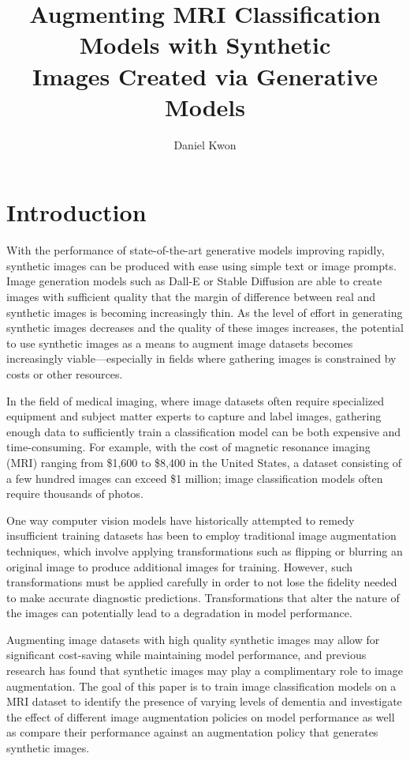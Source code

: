 \documentclass [MAS] {uclathes}
\title          {Augmenting MRI Classification Models with Synthetic \\
                Images Created via Generative Models}
\author         {Daniel Kwon}
\begin{document}
\makeintropages


\chapter{Introduction}
With the performance of state-of-the-art generative models improving rapidly, synthetic images can be produced with ease 
using simple text or image prompts. Image generation models such as Dall-E or Stable Diffusion are able to create images 
with sufficient quality that the margin of difference between real and synthetic images is becoming increasingly thin. 
As the level of effort in generating synthetic images decreases and the quality of these images increases, the potential 
to use synthetic images as a means to augment image datasets becomes increasingly viable---especially in fields where 
gathering images is constrained by costs or other resources.

In the field of medical imaging, where image datasets often require specialized equipment and subject matter experts to 
capture and label images, gathering enough data to sufficiently train a classification model can be both expensive and 
time-consuming. For example, with the cost of magnetic resonance imaging (MRI) ranging from \$1,600 to \$8,400 in the 
United States, a dataset consisting of a few hundred images can exceed \$1 million; image classification models often 
require thousands of photos. 

One way computer vision models have historically attempted to remedy insufficient training datasets has been to employ 
traditional image augmentation techniques, which involve applying transformations such as flipping or blurring an 
original image to produce additional images for training. However, such transformations must be applied carefully in 
order to not lose the fidelity needed to make accurate diagnostic predictions. Transformations that alter the nature of 
the images can potentially lead to a degradation in model performance.

Augmenting image datasets with high quality synthetic images may allow for significant cost-saving while maintaining 
model performance, and previous research has found that synthetic images may play a complimentary role to image 
augmentation. The goal of this paper is to train image classification models on a MRI dataset to identify the presence 
of varying levels of dementia and investigate the effect of different image augmentation policies on model performance 
as well as compare their performance against an augmentation policy that generates synthetic images.
\end{document}

